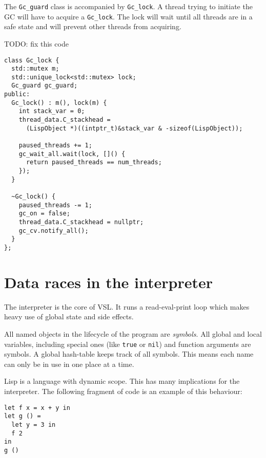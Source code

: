 The \texttt{Gc\_guard} class is accompanied by \texttt{Gc\_lock}. A thread trying to initiate the GC will have to
acquire a \texttt{Gc\_lock}. The lock will wait until all threads are in a safe state and will prevent
other threads from acquiring.

TODO: fix this code
\begin{verbatim}
class Gc_lock {
  std::mutex m;
  std::unique_lock<std::mutex> lock;
  Gc_guard gc_guard;
public:
  Gc_lock() : m(), lock(m) {
    int stack_var = 0;
    thread_data.C_stackhead =
      (LispObject *)((intptr_t)&stack_var & -sizeof(LispObject));

    paused_threads += 1;
    gc_wait_all.wait(lock, []() {
      return paused_threads == num_threads;
    });
  }

  ~Gc_lock() {
    paused_threads -= 1;
    gc_on = false;
    thread_data.C_stackhead = nullptr;
    gc_cv.notify_all();
  }
};
\end{verbatim}


\section{Data races in the interpreter}
\label{sec:symbols}
\label{sec:datarace}
The interpreter is the core of VSL. It runs a read-eval-print loop which makes heavy use of global state and side effects.

All named objects in the lifecycle of the program are \emph{symbols}. All global and local variables, including
special ones (like \texttt{true} or \texttt{nil}) and function arguments are symbols. A global hash-table keeps track of
all symbols. This means each name can only be in use in one place at a time.

Lisp is a language with dynamic scope. This has many implications for the interpreter. The following
fragment of code is an example of this behaviour:
\begin{verbatim}
let f x = x + y in
let g () =
  let y = 3 in
  f 2
in
g ()
\end{verbatim}

